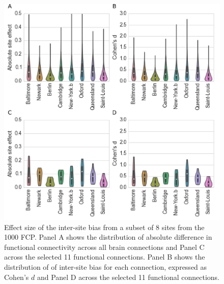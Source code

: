 \documentclass[authoryear]{elsarticle}
\begin{document}
\begin{figure}[htbp]
\begin{center}
\includegraphics[width=\linewidth]{../figures/effect_distribution.png}
\end{center}
\caption[inter site variability]{
Effect size of the inter-site bias from a subset of 8 sites from the 1000 FCP. Panel A shows the distribution of absolute difference in functional connectivity across all brain connections and Panel C across the selected 11 functional connections. Panel B shows the distribution of of inter-site bias for each connection, expressed as Cohen's $d$ and Panel D across the selected 11 functional connections.
}
\label{fig_site_variability}
\end{figure}
\end{document}
